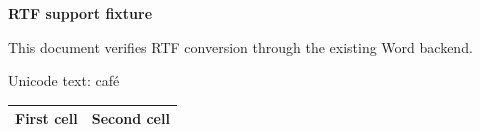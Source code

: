 \documentclass[11pt,a4paper]{article}
\begin{document}
\textbf{RTF support fixture}

This document verifies RTF conversion through the existing Word backend.

Unicode text: café

\begin{table}[h]
\begin{tabular}{|l|l|}
\hline
First cell & Second cell \\ \hline
\end{tabular}
\end{table}
\end{document}
